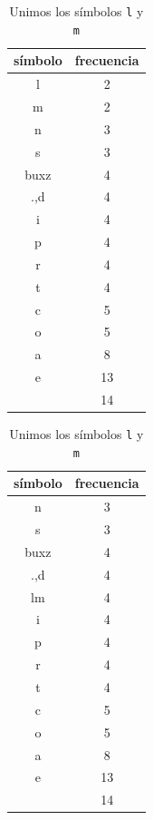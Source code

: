 \documentclass[letterpaper,11pt]{article}
\begin{document}
\begin{enumerate}
    \begin{table}[H]
        \parbox{.45\linewidth}{
        \centering
        \begin{tabular}{|c|c|}
            \hline
            símbolo & frecuencia \\
            \hline
            l & 2 \\
            \hline
            m & 2 \\
            \hline
            n & 3 \\
            \hline
            s & 3 \\
            \hline
            buxz & 4 \\
            \hline
            .,d & 4 \\
            \hline
            i & 4 \\
            \hline
            p & 4 \\
            \hline
            r & 4 \\
            \hline
            t & 4 \\
            \hline
            c & 5 \\
            \hline
            o & 5 \\
            \hline
            a & 8 \\
            \hline
            e & 13 \\
            \hline
            \texttt{\char32} & 14 \\
            \hline
        \end{tabular}
        \caption{Unimos los símbolos \texttt{.,} y \texttt{d}}
        }
        \hfill
        \parbox{.45\linewidth}{
        \centering
        \begin{tabular}{|c|c|}
            \hline
            símbolo & frecuencia \\
            \hline
            n & 3 \\
            \hline
            s & 3 \\
            \hline
            buxz & 4 \\
            \hline
            .,d & 4 \\
            \hline
            lm & 4 \\
            \hline
            i & 4 \\
            \hline
            p & 4 \\
            \hline
            r & 4 \\
            \hline
            t & 4 \\
            \hline
            c & 5 \\
            \hline
            o & 5 \\
            \hline
            a & 8 \\
            \hline
            e & 13 \\
            \hline
            \texttt{\char32} & 14 \\
            \hline
        \end{tabular}
        \caption{Unimos los símbolos \texttt{l} y \texttt{m}}
        }
    \end{table}


\end{enumerate}
\end{document}
